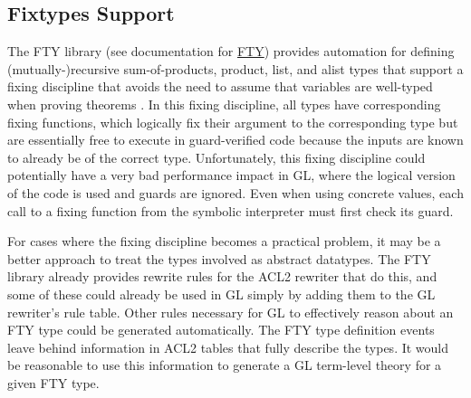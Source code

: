 \documentclass[submission,copyright,creativecommons]{eptcs}
\begin{document}
\subsection{Fixtypes Support}
\label{sec:fixtypes}
The FTY library (see documentation for
\href{http://www.cs.utexas.edu/users/moore/acl2/manuals/current/manual/?topic=ACL2____FTY}{FTY})
provides automation for defining (mutually-)recursive sum-of-products,
product, list, and alist types that support a fixing discipline that
avoids the need to assume that variables are well-typed when proving
theorems \cite{fixyourtypes}.  In this fixing discipline, all types
have corresponding fixing functions, which logically fix their
argument to the corresponding type but are essentially free to execute
in guard-verified code because the inputs are known to already be of
the correct type.  Unfortunately, this fixing discipline could
potentially have a very bad performance impact in GL, where the
logical version of the code is used and guards are ignored.  Even when
using concrete values, each call to a fixing function from the
symbolic interpreter must first check its guard.

For cases where the fixing discipline becomes a practical problem, it
may be a better approach to treat the types involved as abstract
datatypes.  The FTY library already provides rewrite rules for the
ACL2 rewriter that do this, and some of these could already be used in
GL simply by adding them to the GL rewriter's rule table.  Other rules
necessary for GL to effectively reason about an FTY type could be
generated automatically.  The FTY
type definition events leave behind information in ACL2 tables that
fully describe the types.  It would be reasonable to use this
information to generate a GL term-level theory for a given FTY type.
\end{document}
